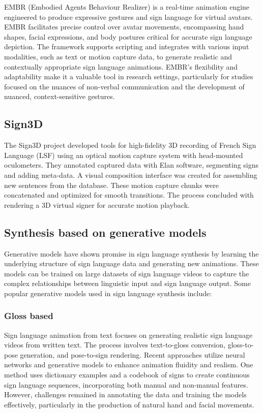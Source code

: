 \documentclass[../../main.tex]{subfiles}
\begin{document}
EMBR (Embodied Agents Behaviour Realizer)\cite{TODO} is a real-time animation engine engineered to produce expressive gestures and sign language for virtual avatars. EMBR facilitates precise control over avatar movements, encompassing hand shapes, facial expressions, and body postures critical for accurate sign language depiction. The framework supports scripting and integrates with various input modalities, such as text or motion capture data, to generate realistic and contextually appropriate sign language animations. EMBR's flexibility and adaptability make it a valuable tool in research settings, particularly for studies focused on the nuances of non-verbal communication and the development of nuanced, context-sensitive gestures.

\subsection{Sign3D}

The Sign3D project developed tools for high-fidelity 3D recording of French Sign Language (LSF) using an optical motion capture system with head-mounted oculometers. They annotated captured data with Elan software, segmenting signs and adding meta-data. A visual composition interface was created for assembling new sentences from the database. These motion capture chunks were concatenated and optimized for smooth transitions. The process concluded with rendering a 3D virtual signer for accurate motion playback.

\subsection{Synthesis based on generative models}

Generative models have shown promise in sign language synthesis by learning the underlying structure of sign language data and generating new animations. These models can be trained on large datasets of sign language videos to capture the complex relationships between linguistic input and sign language output. Some popular generative models used in sign language synthesis include:

\subsubsection{Gloss based}

Sign language animation from text focuses on generating realistic sign language videos from written text. The process involves text-to-gloss conversion, gloss-to-pose generation, and pose-to-sign rendering. Recent approaches utilize neural networks and generative models to enhance animation fluidity and realism. One method uses dictionary examples and a codebook of signs to create continuous sign language sequences, incorporating both manual and non-manual features\cite{TODO}. However, challenges remained in annotating the data and training the models effectively, particularly in the production of natural hand and facial movements.
\end{document}
